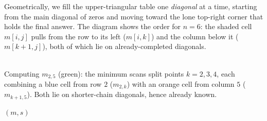 Geometrically, we fill the upper-triangular table one \emph{diagonal} at a time,
starting from the main diagonal of zeros and moving toward the lone top-right
corner that holds the final answer. The diagram shows the order for $n=6$: the
shaded cell $m[i,j]$ pulls from the row to its left ($m[i,k]$) and the column
below it ($m[k+1,j]$), both of which lie on already-completed diagonals.

\begin{center}
\\[1mm]
{\small Computing $m_{2,5}$ (green): the minimum scans split points $k=2,3,4$,
each combining a blue cell from row $2$ ($m_{2,k}$) with an orange cell from
column $5$ ($m_{k+1,5}$). Both lie on shorter-chain diagonals, hence already
known.}
\end{center}

\begin{algorithm}[H]
\caption{\textsc{Matrix-Chain-Order}$(p)$}
\Return $(m, s)$\;
\end{algorithm}

